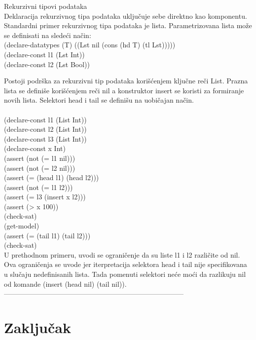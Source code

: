 \documentclass[12pt,oneside]{memoir}
\begin{document}
Rekurzivni tipovi podataka
\\
Deklaracija rekurzivnog tipa podataka uključuje sebe direktno kao komponentu. Standardni primer rekurzivnog tipa podataka je lista. Parametrizovana lista može se definisati na sledeći način:\\
(declare-datatypes (T) ((Lst nil (cons (hd T) (tl Lst)))))
\\(declare-const l1 (Lst Int))
\\(declare-const l2 (Lst Bool))

Postoji podrška za rekurzivni tip podataka korišćenjem ključne reči List. 
Prazna lista se definiše korišćenjem reči nil a konstruktor insert se koristi za formiranje novih lista. Selektori head i tail se definišu na uobičajan način.
\\
\\(declare-const l1 (List Int))
\\(declare-const l2 (List Int))
\\(declare-const l3 (List Int))
\\(declare-const x Int)
\\(assert (not (= l1 nil)))
\\(assert (not (= l2 nil)))
\\(assert (= (head l1) (head l2)))
\\(assert (not (= l1 l2)))
\\(assert (= l3 (insert x l2)))
\\(assert (> x 100))
\\(check-sat)
\\(get-model)
\\(assert (= (tail l1) (tail l2)))
\\(check-sat)
\\
U prethodnom primeru, uvodi se ograničenje da su liste l1 i l2 različite od nil. Ova ograničenja se uvode jer iterpretacija selektora head i tail 
nije specifikovana u slučaju nedefinisanih lista.
Tada pomenuti selektori neće moći da razlikuju nil od komande (insert (head nil) (tail nil)).
------------------------------------------------------------------------------

\pangrami

\pangrami

\chapter{Zaključak}
\pangrami
\end{document}
